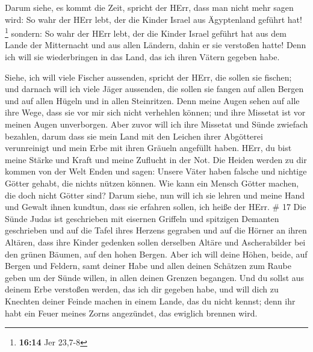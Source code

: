  Darum siehe, es kommt die Zeit, spricht der HErr, dass man
nicht mehr sagen wird: So wahr der HErr lebt, der die Kinder Israel aus
Ägyptenland geführt hat! \footnote{\textbf{16:14} Jer 23,7-8}
 sondern: So wahr der HErr lebt, der die Kinder Israel
geführt hat aus dem Lande der Mitternacht und aus allen Ländern, dahin
er sie verstoßen hatte! Denn ich will sie wiederbringen in das Land, das
ich ihren Vätern gegeben habe.

 Siehe, ich will viele Fischer aussenden, spricht der HErr,
die sollen sie fischen; und darnach will ich viele Jäger aussenden, die
sollen sie fangen auf allen Bergen und auf allen Hügeln und in allen
Steinritzen.  Denn meine Augen sehen auf alle ihre Wege,
dass sie vor mir sich nicht verhehlen können; und ihre Missetat ist vor
meinen Augen unverborgen.  Aber zuvor will ich ihre
Missetat und Sünde zwiefach bezahlen, darum dass sie mein Land mit den
Leichen ihrer Abgötterei verunreinigt und mein Erbe mit ihren Gräueln
angefüllt haben.  HErr, du bist meine Stärke und Kraft und
meine Zuflucht in der Not. Die Heiden werden zu dir kommen von der Welt
Enden und sagen: Unsere Väter haben falsche und nichtige Götter gehabt,
die nichts nützen können.  Wie kann ein Mensch Götter
machen, die doch nicht Götter sind?  Darum siehe, nun will
ich sie lehren und meine Hand und Gewalt ihnen kundtun, dass sie
erfahren sollen, ich heiße der HErr. \# 17  Die Sünde Judas
ist geschrieben mit eisernen Griffeln und spitzigen Demanten geschrieben
und auf die Tafel ihres Herzens gegraben und auf die Hörner an ihren
Altären,  dass ihre Kinder gedenken sollen derselben Altäre
und Ascherabilder bei den grünen Bäumen, auf den hohen Bergen.
 Aber ich will deine Höhen, beide, auf Bergen und Feldern,
samt deiner Habe und allen deinen Schätzen zum Raube geben um der Sünde
willen, in allen deinen Grenzen begangen.  Und du sollst aus
deinem Erbe verstoßen werden, das ich dir gegeben habe, und will dich zu
Knechten deiner Feinde machen in einem Lande, das du nicht kennst; denn
ihr habt ein Feuer meines Zorns angezündet, das ewiglich brennen wird.

